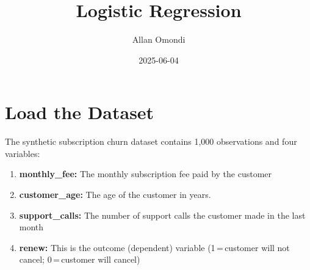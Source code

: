 \documentclass[
]{article}
\title{Logistic Regression}
\author{Allan Omondi}
\date{2025-06-04}
\newenvironment{Shaded}{\begin{snugshade}}{\end{snugshade}}
\newcommand{\AttributeTok}[1]{\textcolor[rgb]{0.13,0.29,0.53}{#1}}
\newcommand{\ConstantTok}[1]{\textcolor[rgb]{0.56,0.35,0.01}{#1}}
\newcommand{\ControlFlowTok}[1]{\textcolor[rgb]{0.13,0.29,0.53}{\textbf{#1}}}
\newcommand{\FunctionTok}[1]{\textcolor[rgb]{0.13,0.29,0.53}{\textbf{#1}}}
\newcommand{\NormalTok}[1]{#1}
\newcommand{\SpecialCharTok}[1]{\textcolor[rgb]{0.81,0.36,0.00}{\textbf{#1}}}
\newcommand{\StringTok}[1]{\textcolor[rgb]{0.31,0.60,0.02}{#1}}
\begin{document}
\maketitle

{
\setcounter{tocdepth}{4}
\tableofcontents
}
\begin{Shaded}
\end{Shaded}

\section{Load the Dataset}\label{load-the-dataset}

The synthetic subscription churn dataset contains 1,000 observations and
four variables:

\begin{enumerate}
\def\labelenumi{\arabic{enumi}.}
\item
  \textbf{monthly\_fee:} The monthly subscription fee paid by the
  customer
\item
  \textbf{customer\_age:} The age of the customer in years.
\item
  \textbf{support\_calls:} The number of support calls the customer made
  in the last month
\item
  \textbf{renew:} This is the outcome (dependent) variable
  (1\,=\,customer will not cancel; 0\,=\,customer will cancel)
\end{enumerate}
\end{document}
